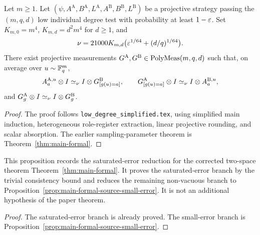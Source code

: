 \begin{theorem}\label{thm:main-formal-simplified}
	\leanok
	Let $m\geq1$. Let $(\psi,A^{\mathrm A},B^{\mathrm A},L^{\mathrm A},
	A^{\mathrm B},B^{\mathrm B},L^{\mathrm B})$ be a projective strategy
	passing the $(m,q,d)$ low individual degree test with probability at least
	$1-\varepsilon$. Set $K_{m,0}=m^4$, $K_{m,d}=d^2m^4$ for $d\ge1$, and
	\[
		\nu=21000K_{m,d}\bigl(\varepsilon^{1/64}+(d/q)^{1/64}\bigr).
	\]
	There exist projective measurements
	$G^{\mathrm A},G^{\mathrm B}\in\mathrm{PolyMeas}(m,q,d)$ such that, on average
	over $u\sim\mathbb{F}_q^m$,
	\[
		A_a^{\mathrm A,u}\otimes I\simeq_\nu I\otimes G^{\mathrm B}_{[g(u)=a]},
		\qquad
		G^{\mathrm A}_{[g(u)=a]}\otimes I\simeq_\nu I\otimes A_a^{\mathrm B,u},
	\]
	and $G_g^{\mathrm A}\otimes I\simeq_\nu I\otimes G_g^{\mathrm B}$.
\end{theorem}
\begin{proof}
	\leanok
	The proof follows \texttt{low\_degree\_simplified.tex},
	using simplified main induction, heterogeneous role-register extraction,
	linear projective rounding, and scalar absorption. The earlier
	sampling-parameter theorem is Theorem~\ref{thm:main-formal}.
\end{proof}

\begin{proposition}\label{prop:main-formal-source-reduction}
	\leanok
	This proposition records the saturated-error reduction for the corrected
	two-space theorem
	Theorem~\ref{thm:main-formal}.  It proves the saturated-error branch by the
	trivial consistency bound and reduces the remaining non-vacuous branch to
	Proposition~\ref{prop:main-formal-source-small-error}.  It is not
	an additional hypothesis of the paper theorem.
\end{proposition}
\begin{proof}
	\leanok
	The saturated-error branch is already proved.  The small-error branch is
	Proposition~\ref{prop:main-formal-source-small-error}.
\end{proof}

